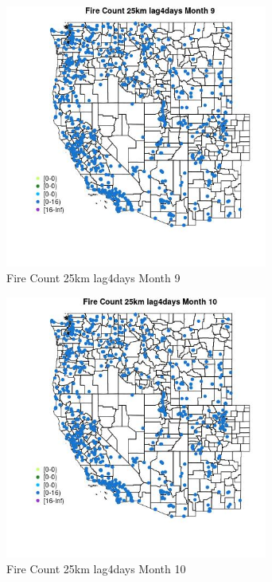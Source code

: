 \begin{figure} 
\centering  
\includegraphics[width=0.77\textwidth]{Code_Outputs/Report_ML_input_PM25_Step4_part_e_de_duplicated_aves_compiled_2019-05-21wNAs_MapObsMo9Fire_Count_25km_lag4days.jpg} 
\caption{\label{fig:Report_ML_input_PM25_Step4_part_e_de_duplicated_aves_compiled_2019-05-21wNAsMapObsMo9Fire_Count_25km_lag4days}Fire Count 25km lag4days Month 9} 
\end{figure} 
 

\begin{figure} 
\centering  
\includegraphics[width=0.77\textwidth]{Code_Outputs/Report_ML_input_PM25_Step4_part_e_de_duplicated_aves_compiled_2019-05-21wNAs_MapObsMo10Fire_Count_25km_lag4days.jpg} 
\caption{\label{fig:Report_ML_input_PM25_Step4_part_e_de_duplicated_aves_compiled_2019-05-21wNAsMapObsMo10Fire_Count_25km_lag4days}Fire Count 25km lag4days Month 10} 
\end{figure} 
 

